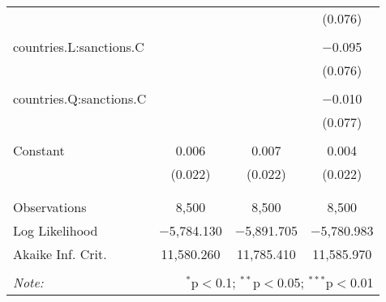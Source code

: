 \begin{table}[!htbp]
\begin{tabular}{@{\extracolsep{5pt}}lccc}
  &  &  & (0.076) \\ 
  & & & \\ 
 countries.L:sanctions.C &  &  & $-$0.095 \\ 
  &  &  & (0.076) \\ 
  & & & \\ 
 countries.Q:sanctions.C &  &  & $-$0.010 \\ 
  &  &  & (0.077) \\ 
  & & & \\ 
 Constant & 0.006 & 0.007 & 0.004 \\ 
  & (0.022) & (0.022) & (0.022) \\ 
  & & & \\ 
\hline \\[-1.8ex] 
Observations & 8,500 & 8,500 & 8,500 \\ 
Log Likelihood & $-$5,784.130 & $-$5,891.705 & $-$5,780.983 \\ 
Akaike Inf. Crit. & 11,580.260 & 11,785.410 & 11,585.970 \\ 
\hline 
\hline \\[-1.8ex] 
\textit{Note:}  & \multicolumn{3}{r}{$^{*}$p$<$0.1; $^{**}$p$<$0.05; $^{***}$p$<$0.01} \\ 
\end{tabular} 
\end{table}  
